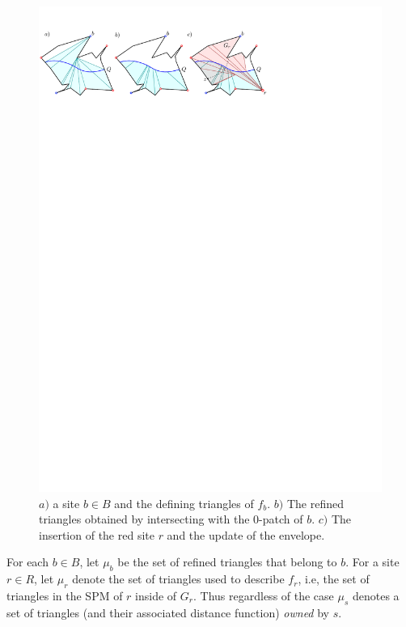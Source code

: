 \documentclass[a4paper, 11pt]{article}
\newcommand{\icell}[1][i]{${#1}$-patch\xspace}
\begin{document}
\begin{figure}[ht]
\centering
\includegraphics{imgRefinedDiagram.pdf}
\caption{$a)$ a site $b\in B$ and the defining triangles of $f_b$. 
$b)$ The refined triangles obtained by intersecting with the \icell[0] of $b$.
$c)$ The insertion of the red site $r$ and the update of the envelope. }
\label{fig:RrefinedDiagram}
\end{figure}



For each $b\in B$, let $\mu_b$ be the set of refined triangles that belong to $b$. 
For a site $r\in R$, let $\mu_r$ denote the set of triangles used to describe $f_r$, i.e,  the set of triangles in the SPM of $r$ inside of $G_r$.
Thus regardless of the case $\mu_s$ denotes a set of triangles (and their associated distance function) \emph{owned} by $s$.
\end{document}
